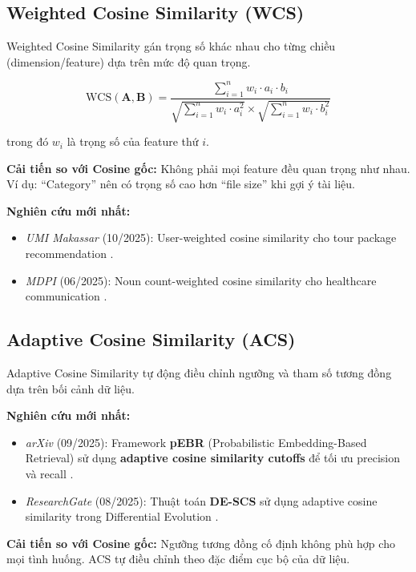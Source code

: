 \documentclass[12pt,a4paper]{article}
\begin{document}
\subsection{Weighted Cosine Similarity (WCS)}

Weighted Cosine Similarity gán trọng số khác nhau cho từng chiều (dimension/feature) dựa trên mức độ quan trọng.

\begin{equation}
\text{WCS}(\mathbf{A}, \mathbf{B}) = \frac{\sum_{i=1}^{n} w_i \cdot a_i \cdot b_i}{\sqrt{\sum_{i=1}^{n} w_i \cdot a_i^2} \times \sqrt{\sum_{i=1}^{n} w_i \cdot b_i^2}}
\label{eq:wcs}
\end{equation}

trong đó $w_i$ là trọng số của feature thứ $i$.

\noindent\textbf{Cải tiến so với Cosine gốc:} Không phải mọi feature đều quan trọng như nhau. Ví dụ: ``Category'' nên có trọng số cao hơn ``file size'' khi gợi ý tài liệu.

\noindent\textbf{Nghiên cứu mới nhất:}
\begin{itemize}[noitemsep]
    \item \textit{UMI Makassar} (10/2025): User-weighted cosine similarity cho tour package recommendation \cite{umi2025}.
    \item \textit{MDPI} (06/2025): Noun count-weighted cosine similarity cho healthcare communication \cite{mdpi2025}.
\end{itemize}

\subsection{Adaptive Cosine Similarity (ACS)}

Adaptive Cosine Similarity tự động điều chỉnh ngưỡng và tham số tương đồng dựa trên bối cảnh dữ liệu.

\noindent\textbf{Nghiên cứu mới nhất:}
\begin{itemize}[noitemsep]
    \item \textit{arXiv} (09/2025): Framework \textbf{pEBR} (Probabilistic Embedding-Based Retrieval) sử dụng \textbf{adaptive cosine similarity cutoffs} để tối ưu precision và recall \cite{pebr2025}.
    \item \textit{ResearchGate} (08/2025): Thuật toán \textbf{DE-SCS} sử dụng adaptive cosine similarity trong Differential Evolution \cite{descs2025}.
\end{itemize}

\noindent\textbf{Cải tiến so với Cosine gốc:} Ngưỡng tương đồng cố định không phù hợp cho mọi tình huống. ACS tự điều chỉnh theo đặc điểm cục bộ của dữ liệu.
\end{document}
